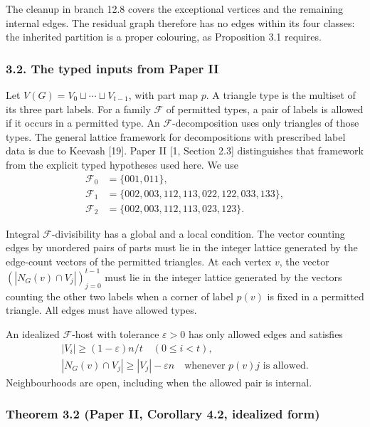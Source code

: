 \documentclass[english,11pt,a4paper]{article}
\begin{document}
The cleanup in branch 12.8 covers the exceptional vertices and the remaining internal edges. The residual graph therefore has no edges within its four classes: the inherited partition is a proper colouring, as Proposition 3.1 requires.

\subsubsection{3.2. The typed inputs from Paper II}\label{the-typed-inputs-from-paper-ii}

Let \(V(G)=V_0\sqcup\cdots\sqcup V_{t-1}\), with part map \(p\). A triangle type is the multiset of its three part labels. For a family \(\mathcal F\) of permitted types, a pair of labels is allowed if it occurs in a permitted type. An \(\mathcal F\)-decomposition uses only triangles of those types. The general lattice framework for decompositions with prescribed label data is due to Keevash {[}19{]}. Paper II {[}1, Section 2.3{]} distinguishes that framework from the explicit typed hypotheses used here. We use \[\begin{aligned}
\mathcal F_0&=\{001,011\},\\
\mathcal F_1&=\{002,003,112,113,022,122,033,133\},\\
\mathcal F_2&=\{002,003,112,113,023,123\}.
\end{aligned}
\tag{3.2}\]

Integral \(\mathcal F\)-divisibility has a global and a local condition. The vector counting edges by unordered pairs of parts must lie in the integer lattice generated by the edge-count vectors of the permitted triangles. At each vertex \(v\), the vector \((|N_G(v)\cap V_j|)_{j=0}^{t-1}\) must lie in the integer lattice generated by the vectors counting the other two labels when a corner of label \(p(v)\) is fixed in a permitted triangle. All edges must have allowed types.

An idealized \(\mathcal F\)-host with tolerance \(\varepsilon>0\) has only allowed edges and satisfies \[\begin{gathered}
|V_i|\ge(1-\varepsilon)n/t\quad(0\le i<t),\\
|N_G(v)\cap V_j|\ge|V_j|-\varepsilon n
\quad\text{whenever }p(v)j\text{ is allowed}.
\end{gathered}
\tag{3.3}\] Neighbourhoods are open, including when the allowed pair is internal.

\subsubsection{Theorem 3.2 (Paper II, Corollary 4.2, idealized form)}\label{theorem-3.2-paper-ii-corollary-4.2-idealized-form}
\end{document}
